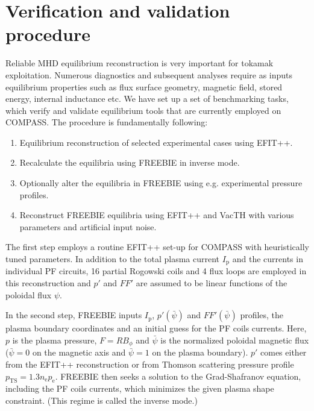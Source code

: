 
\section{Verification and validation procedure} %
\label{sec:procedure}

Reliable MHD equilibrium reconstruction is very important for tokamak exploitation. Numerous diagnostics and subsequent analyses require as inputs equilibrium properties such as flux surface geometry, magnetic field, stored energy, internal inductance etc. We have set up a set of benchmarking tasks, which verify and validate equilibrium tools that are currently employed on COMPASS. The procedure is fundamentally following:

\begin{enumerate}
	\item Equilibrium reconstruction of selected experimental cases using EFIT++.
	\item Recalculate the equilibria using FREEBIE in inverse mode.
	\item Optionally alter the equilibria in FREEBIE using e.g. experimental pressure profiles.
	\item Reconstruct FREEBIE equilibria using EFIT++ and VacTH with various parameters and artificial input noise.
\end{enumerate}

The first step employs a routine EFIT++ set-up for COMPASS with heuristically tuned parameters. In addition to the total plasma current $I_\mathrm{p}$ and the currents in individual PF circuits, 16 partial Rogowski coils and 4 flux loops are employed in this reconstruction and $p'$ and $FF'$ are assumed to be linear functions of the poloidal flux $\psi$.

In the second step, FREEBIE inputs $I_\mathrm{p}$, $p'\left( {\bar \psi } \right)$ and $FF'\left( {\bar \psi } \right)$ profiles, the plasma boundary coordinates and an initial guess for the PF coils currents. Here, $p$ is the plasma pressure, $F = RB_\phi$ and $\bar\psi$ is the normalized poloidal magnetic flux ($\bar\psi = 0$ on the magnetic axis and $\bar\psi = 1$ on the plasma boundary). $p'$ comes either from the EFIT++ reconstruction or from Thomson scattering pressure profile $p_\mathrm{TS} = 1.3 n_\mathrm{e} p_\mathrm{e}$. FREEBIE then seeks a solution to the Grad-Shafranov equation, including the PF coils currents, which minimizes the given plasma shape constraint. (This regime is called the inverse mode.)

